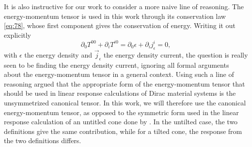 It is also instructive for our work to consider a more naive line of reasoning.
The energy-momentum tensor is used in this work through its conservation law \cref{eq:78}, whose first component gives the conservation of energy.
Writing it out explicitly
\begin{equation}
  \label{eq:84}
  \partial_0T^{00} + \partial_i T^{i0} = \partial_0 \epsilon + \partial_i j^i_{\epsilon} = 0,
\end{equation}
with \( \epsilon \) the energy density and \( \vec{j}_{\epsilon} \) the energy density current, the question is really seen to be finding the energy density current, ignoring all formal arguments about the energy-momentum tensor in a general context.
Using such a line of reasoning \textcite{vanderwurffMagnetovorticalThermoelectricTransport2019} argued that the appropriate form of the energy-momentum tensor that should be used in linear response calculations of Dirac material systems is the unsymmetrized canonical tensor.
In this work, we will therefore use the canonical energy-momentum tensor, as opposed to the symmetric form used in the linear response calculation of an untitled cone done by \textcite{arjonaFingerprintsConformalAnomaly2019}.
In the untilted case, the two definitions give the same contribution, while for a tilted cone, the response from the two definitions differs.

